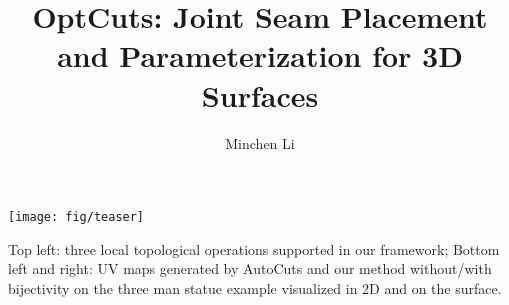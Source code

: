 \documentclass[acmtog, review, anonymous]{acmart}
\begin{document}
\title{OptCuts: Joint %
Seam Placement and Parameterization for 3D Surfaces} 

\author{Minchen Li}

\renewcommand\shortauthors{Li, M. et al}

\newcommand{\minchen}[1]{\textcolor{blue}{\textbf{Minchen: #1}}}
\newcommand{\justin}[1]{\textcolor{red}{\textbf{Justin: #1}}}
\newcommand{\alla}[1]{\textcolor{orange}{\textbf{Alla: #1}}}
\newcommand{\danny}[1]{\textcolor{purple}{\textbf{Danny: #1}}}
\newcommand{\vova}[1]{\textcolor{green}{\textbf{Vova: #1}}}

\begin{teaserfigure}
\centering
  \texttt{[image: fig/teaser]}
  \caption{Top left: three local topological operations supported in our framework; Bottom left and right: UV maps generated by AutoCuts and our method without/with bijectivity on the three man statue example visualized in 2D and on the surface.}
  \label{fig:teaser}
\end{teaserfigure}
\end{document}
